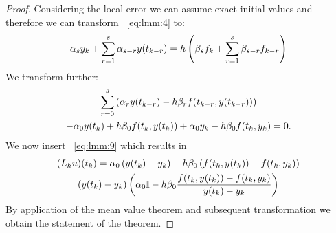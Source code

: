 \begin{proof}
  Considering the local error we can assume exact initial values 
  and therefore we can transform ~\ref{eq:lmm:4} to:
  \begin{gather*}
    \alpha_s y_k + \sum\limits_{r=1}^s \alpha_{s-r} y(t_{k-r})
    = h \left( \beta_s f_k + \sum\limits_{r=1}^s \beta_{s-r} f_{k-r} \right)
  \end{gather*}
  We transform further:
  \begin{multline*}
    \sum\limits_{r=0}^{s} \left( \alpha_r y(t_{k-r})
      - h \beta_r f(t_{k-r},y(t_{k-r})) \right)
    \\
    - \alpha_0 y(t_k) + h \beta_0 f(t_k, y(t_k)) + \alpha_0 y_k
    - h \beta_0 f(t_k,y_k) = 0.
  \end{multline*}
	We now insert ~\ref{eq:lmm:9} which results in
  \begin{gather*}
    (L_h u)(t_k) = \alpha_0 \left( y(t_k) - y_k \right) - h \beta_0 \left( f(t_k,y(t_k)) - f(t_k,y_k) \right)
    \\
    \left( y(t_k) - y_k \right) \left( \alpha_0 \mathbb I - h \beta_0 \frac{f(t_k,y(t_k)) - f(t_k,y_k)}{y(t_k) - y_k} \right)
  \end{gather*}
  By application of the mean value theorem and 
  subsequent transformation we obtain the statement of the theorem.
\end{proof}





